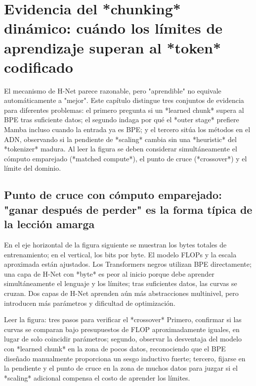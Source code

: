\section{Evidencia del *chunking* dinámico: cuándo los límites de aprendizaje superan al *token* codificado}

El mecanismo de H-Net parece razonable, pero "aprendible" no equivale automáticamente a "mejor". Este capítulo distingue tres conjuntos de evidencia para diferentes problemas: el primero pregunta si un *learned chunk* supera al BPE tras suficiente datos; el segundo indaga por qué el *outer stage* prefiere Mamba incluso cuando la entrada ya es BPE; y el tercero sitúa los métodos en el ADN, observando si la pendiente de *scaling* cambia sin una *heuristic* del *tokenizer* madura. Al leer la figura se deben considerar simultáneamente el cómputo emparejado (*matched compute*), el punto de cruce (*crossover*) y el límite del dominio.

\subsection{Punto de cruce con cómputo emparejado: "ganar después de perder" es la forma típica de la lección amarga}

En el eje horizontal de la figura siguiente se muestran los bytes totales de entrenamiento; en el vertical, los bits por byte. El modelo FLOPs y la escala aproximada están ajustados. Los Transformers negros utilizan BPE directamente; una capa de H-Net con *byte* es peor al inicio porque debe aprender simultáneamente el lenguaje y los límites; tras suficientes datos, las curvas se cruzan. Dos capas de H-Net aprenden aún más abstracciones multinivel, pero introducen más parámetros y dificultad de optimización.


\begin{knowledgebox}{Leer la figura: tres pasos para verificar el *crossover*}
Primero, confirmar si las curvas se comparan bajo presupuestos de FLOP aproximadamente iguales, en lugar de solo coincidir parámetros; segundo, observar la desventaja del modelo con *learned chunk* en la zona de pocos datos, reconociendo que el BPE diseñado manualmente proporciona un sesgo inductivo fuerte; tercero, fijarse en la pendiente y el punto de cruce en la zona de muchos datos para juzgar si el *scaling* adicional compensa el costo de aprender los límites.
\end{knowledgebox}

